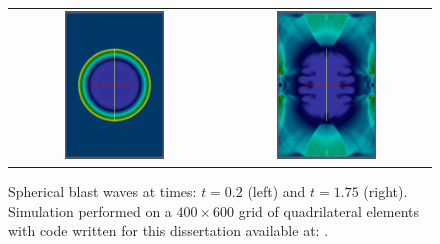 \begin{figure}[htbp]\figSpace 
\begin{tabular}{cc}
\includegraphics[width=0.5\textwidth]{fig/bw0020.jpg} & 
\includegraphics[width=0.5\textwidth]{fig/bw0175.jpg} 
\end{tabular}
\caption{Spherical blast waves at times: $t=0.2$ (left) and $t=1.75$ (right).  Simulation performed on a $400 \times 600$ grid of quadrilateral elements with code written for this dissertation available at: \protect\gitrepo.}
\label{fig:blast_waves}
\figSpace
\end{figure}

